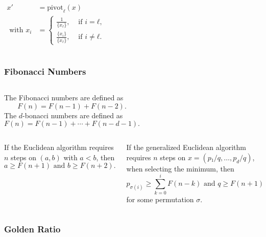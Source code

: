 \documentclass[aspectratio=169]{beamer}
\begin{document}
\begin{frame}
  \begin{columns}

    \begin{align*}
      x' & = \mathrm{pivot}_ℓ(x) \\
      \text{ with } x_i & = \begin{cases}
        \frac{1}{\{x_ℓ\}}, & \text{ if } i = ℓ, \\
        \frac{\{x_i\}}{\{x_ℓ\}}, & \text{ if } i ≠ ℓ.
      \end{cases}
    \end{align*}
  \end{columns}
\end{frame}

\begin{frame}
  \frametitle{Fibonacci Numbers}
  \small
  \begin{columns}[T]
    The Fibonacci numbers are defined as
    \[
      F(n) = F(n - 1) + F(n - 2).
    \]
    The $d$-bonacci numbers are defined as
    \[
      F(n) = F(n - 1) + ⋯ + F(n - d - 1).
    \]
  \end{columns}
  \vspace{1em}
  \begin{columns}[T]
    \begin{theorem}
      If the Euclidean algorithm requires $n$ steps on $(a, b)$ with $a < b$,
      then \[
        a ≥ F(n+1) \text{ and } b ≥ F(n+2).
      \]
    \end{theorem}

    \begin{theorem}
      If the generalized Euclidean algorithm requires $n$ steps on $x = (p₁/q, …, p_d/q)$,
      when selecting the minimum,
      then \[
        p_{σ(i)} ≥ ∑_{k=0}^i F(n-k) \text{ and } q ≥ F(n+1)
      \]
      for some permutation $σ$.
    \end{theorem}
  \end{columns}
\end{frame}

\begin{frame}
  \frametitle{Golden Ratio}

  \begin{columns}

  \end{columns}
\end{frame}
\end{document}
